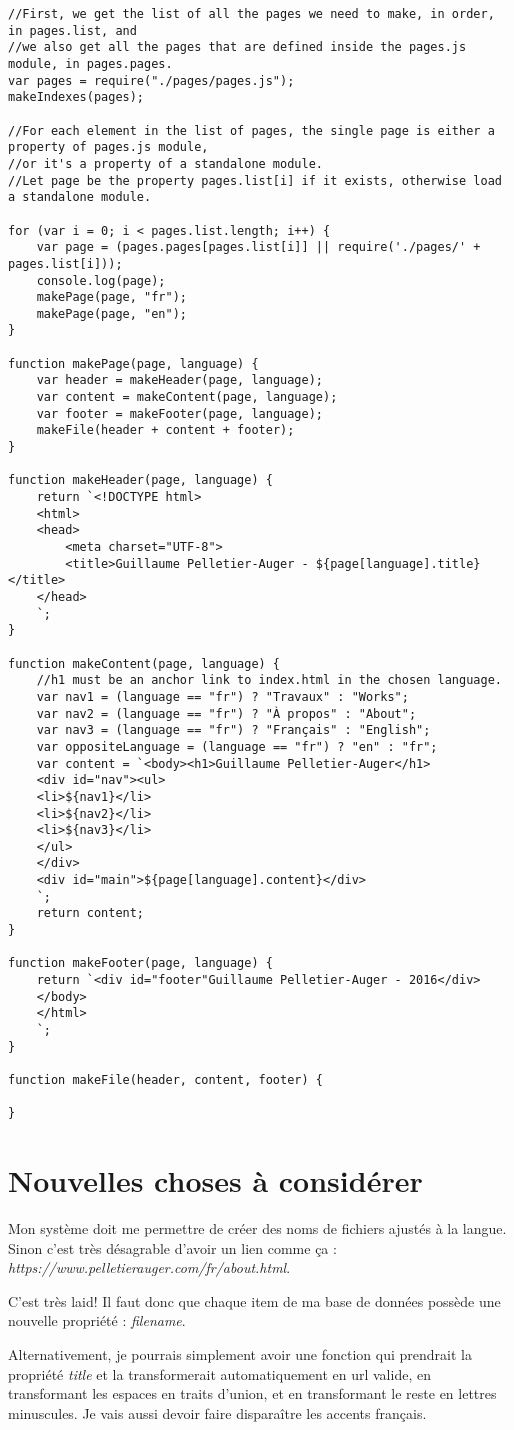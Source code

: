 \begin{lstlisting}
//First, we get the list of all the pages we need to make, in order, in pages.list, and
//we also get all the pages that are defined inside the pages.js module, in pages.pages.
var pages = require("./pages/pages.js");
makeIndexes(pages);

//For each element in the list of pages, the single page is either a property of pages.js module,
//or it's a property of a standalone module.
//Let page be the property pages.list[i] if it exists, otherwise load a standalone module.

for (var i = 0; i < pages.list.length; i++) {
    var page = (pages.pages[pages.list[i]] || require('./pages/' + pages.list[i]));
    console.log(page);
    makePage(page, "fr");
    makePage(page, "en");
}

function makePage(page, language) {
    var header = makeHeader(page, language);
    var content = makeContent(page, language);
    var footer = makeFooter(page, language);
    makeFile(header + content + footer);
}

function makeHeader(page, language) {
    return `<!DOCTYPE html>
    <html>
    <head>
        <meta charset="UTF-8">
        <title>Guillaume Pelletier-Auger - ${page[language].title}</title>
    </head>
    `;
}

function makeContent(page, language) {
    //h1 must be an anchor link to index.html in the chosen language.
    var nav1 = (language == "fr") ? "Travaux" : "Works";
    var nav2 = (language == "fr") ? "À propos" : "About";
    var nav3 = (language == "fr") ? "Français" : "English";
    var oppositeLanguage = (language == "fr") ? "en" : "fr";
    var content = `<body><h1>Guillaume Pelletier-Auger</h1>
    <div id="nav"><ul>
    <li>${nav1}</li>
    <li>${nav2}</li>
    <li>${nav3}</li>
    </ul>
    </div>
    <div id="main">${page[language].content}</div>
    `;
    return content;
}

function makeFooter(page, language) {
    return `<div id="footer"Guillaume Pelletier-Auger - 2016</div>
    </body>
    </html>
    `;
}

function makeFile(header, content, footer) {

}

\end{lstlisting}

\section{Nouvelles choses à considérer}
Mon système doit me permettre de créer des noms de fichiers ajustés à la langue. Sinon c'est très désagrable d'avoir un lien comme ça : \textit{https://www.pelletierauger.com/fr/about.html}.

C'est très laid! Il faut donc que chaque item de ma base de données possède une nouvelle propriété : \textit{filename}.

Alternativement, je pourrais simplement avoir une fonction qui prendrait la propriété \textit{title} et la transformerait automatiquement en url valide, en transformant les espaces en traits d'union, et en transformant le reste en lettres minuscules. Je vais aussi devoir faire disparaître les accents français.
